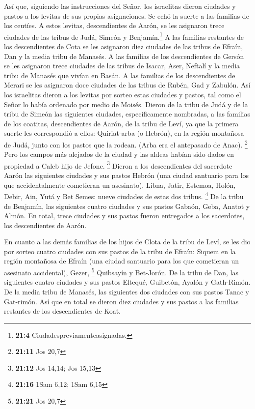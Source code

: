  Así que, siguiendo las instrucciones del Señor, los
israelitas dieron ciudades y pastos a los levitas de sus propias
asignaciones.  Se echó la suerte a las familias de los
ceutíes. A estos levitas, descendientes de Aarón, se les asignaron trece
ciudades de las tribus de Judá, Simeón y Benjamín.\footnote{\textbf{21:4}
  Ciudadespreviamenteasignadas.}  A las familias restantes
de los descendientes de Cota se les asignaron diez ciudades de las
tribus de Efraín, Dan y la media tribu de Manasés.  A las
familias de los descendientes de Gersón se les asignaron trece ciudades
de las tribus de Isacar, Aser, Neftalí y la media tribu de Manasés que
vivían en Basán.  A las familias de los descendientes de
Merari se les asignaron doce ciudades de las tribus de Rubén, Gad y
Zabulón.  Así los israelitas dieron a los levitas por
sorteo estas ciudades y pastos, tal como el Señor lo había ordenado por
medio de Moisés.  Dieron de la tribu de Judá y de la tribu
de Simeón las siguientes ciudades, específicamente nombradas,
 a las familias de los coatitas, descendientes de Aarón,
de la tribu de Leví, ya que la primera suerte les correspondió a ellos:
 Quiriat-arba (o Hebrón), en la región montañosa de Judá,
junto con los pastos que la rodean. (Arba era el antepasado de Anac).
\footnote{\textbf{21:11} Jos 20,7}  Pero los campos más
alejados de la ciudad y las aldeas habían sido dados en propiedad a
Caleb hijo de Jefone. \footnote{\textbf{21:12} Jos 14,14; Jos 15,13}
 Dieron a los descendientes del sacerdote Aarón las
siguientes ciudades y sus pastos Hebrón (una ciudad santuario para los
que accidentalmente cometieran un asesinato), Libna, 
Jatir, Estemoa,  Holón, Debir,  Ain, Yutá
y Bet Semes: nueve ciudades de estas dos tribus. \footnote{\textbf{21:16}
  1Sam 6,12; 1Sam 6,15}  De la tribu de Benjamín, las
siguientes cuatro ciudades y sus pastos Gabaón, Geba, 
Anatot y Almón.  En total, trece ciudades y sus pastos
fueron entregados a los sacerdotes, los descendientes de Aarón.

 En cuanto a las demás familias de los hijos de Clota de
la tribu de Leví, se les dio por sorteo cuatro ciudades con sus pastos
de la tribu de Efraín:  Siquem en la región montañosa de
Efraín (una ciudad santuario para los que cometieran un asesinato
accidental), Gezer, \footnote{\textbf{21:21} Jos 20,7} 
Quibsayín y Bet-Jorón.  De la tribu de Dan, las
siguientes cuatro ciudades y sus pastos Eltequé, Guibetón,
 Ayalón y Gath-Rimón.  De la media tribu
de Manasés, las siguientes dos ciudades con sus pastos Tanac y
Gat-rimón.  Así que en total se dieron diez ciudades y
sus pastos a las familias restantes de los descendientes de Koat.

